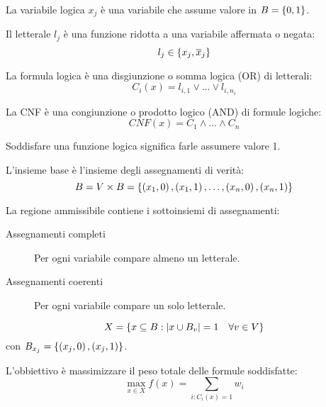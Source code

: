 \documentclass[\main/main.tex]{subfiles}
\begin{document}
\begin{multicols}{2}
    \begin{property}
        La variabile logica \(x_{j}\) è una variabile che assume valore in \(B = \left\{0, 1\right\}\).
    \end{property}
    \begin{property}[Letterale]
        Il letterale \(l_{j}\) è una funzione ridotta a una variabile affermata o negata:
        \[
            l_{j} \in \left\{x_{j}, \overline{x}_{j}\right\}
        \]
    \end{property}
    \begin{property}
        La formula logica è una disgiunzione o somma logica (OR) di letterali:
        \[
            C_i(x) = l_{i, 1} \lor \ldots \lor l_{i, n_i}
        \]
    \end{property}
    \begin{property}[CNF]
        La CNF è una congiunzione o prodotto logico (AND) di formule logiche:
        \[
            CNF(x) = C_1 \land \ldots \land C_n
        \]
    \end{property}
    \begin{property}
        Soddisfare una funzione logica significa farle assumere valore 1.
    \end{property}
    \begin{definition}
        L'insieme base è l'insieme degli assegnamenti di verità:
        \[
            B = V \times B = \left\{\left(x_1, 0\right), \left(x_1, 1\right), \ldots, \left(x_n, 0\right), \left(x_n, 1\right)\right\}
        \]
    \end{definition}
    \begin{definition}
        La regione ammissibile contiene i sottoinsiemi di assegnamenti:
        \begin{description}
            \item[Assegnamenti completi] Per ogni variabile compare almeno un letterale.
            \item[Assegnamenti coerenti] Per ogni variabile compare un solo letterale.
        \end{description}
        \[
            X = \left\{x \subseteq B: \left\lvert x \cup B_v\right\rvert = 1 \quad \forall v \in V\right\}
        \]
        con \(B_{x_j} = \left\{\left(x_j, 0\right), \left(x_j, 1\right)\right\}\).
    \end{definition}
    \begin{definition}
        L'obbiettivo è massimizzare il peso totale delle formule soddisfatte:
        \[
            \max_{x \in X} f(x) = \sum_{i: C_i (x) = 1} w_i
        \]
    \end{definition}
\end{multicols}
\end{document}
